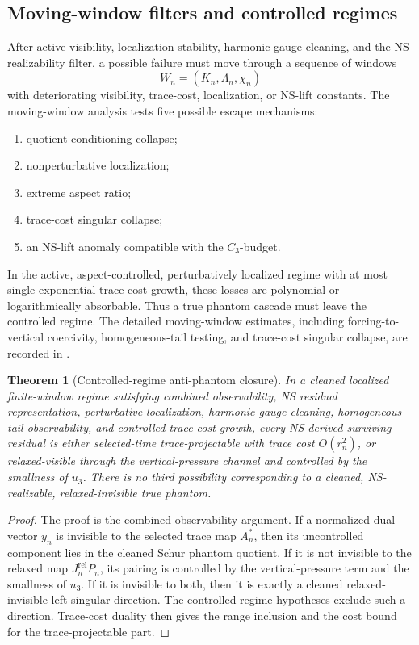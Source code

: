 \documentclass[11pt]{article}
\numberwithin{equation}{section}
\newtheorem{theorem}{Theorem}[section]
\newcommand{\rel}{\mathrm{rel}}
\begin{document}
\subsection{Moving-window filters and controlled regimes}
After active visibility, localization stability, harmonic-gauge cleaning, and the NS-realizability filter, a possible failure must move through a sequence of windows
\[
  W_n=(K_n,\Lambda_n,\chi_n)
\]
with deteriorating visibility, trace-cost, localization, or NS-lift constants. The moving-window analysis tests five possible escape mechanisms:
\begin{enumerate}[label=(\roman*)]
\item quotient conditioning collapse;
\item nonperturbative localization;
\item extreme aspect ratio;
\item trace-cost singular collapse;
\item an NS-lift anomaly compatible with the \(C_3\)-budget.
\end{enumerate}
In the active, aspect-controlled, perturbatively localized regime with at most single-exponential trace-cost growth, these losses are polynomial or logarithmically absorbable. Thus a true phantom cascade must leave the controlled regime. The detailed moving-window estimates, including forcing-to-vertical coercivity, homogeneous-tail testing, and trace-cost singular collapse, are recorded in .

\begin{theorem}[Controlled-regime anti-phantom closure]
In a cleaned localized finite-window regime satisfying combined observability, NS residual representation, perturbative localization, harmonic-gauge cleaning, homogeneous-tail observability, and controlled trace-cost growth, every NS-derived surviving residual is either selected-time trace-projectable with trace cost \(O(r_n^2)\), or relaxed-visible through the vertical-pressure channel and controlled by the smallness of \(u_3\). There is no third possibility corresponding to a cleaned, NS-realizable, relaxed-invisible true phantom.
\end{theorem}

\begin{proof}
The proof is the combined observability argument. If a normalized dual vector \(y_n\) is invisible to the selected trace map \(A_n^*\), then its uncontrolled component lies in the cleaned Schur phantom quotient. If it is not invisible to the relaxed map \(J_n^{\rel}P_n\), its pairing is controlled by the vertical-pressure term and the smallness of \(u_3\). If it is invisible to both, then it is exactly a cleaned relaxed-invisible left-singular direction. The controlled-regime hypotheses exclude such a direction. Trace-cost duality then gives the range inclusion and the cost bound for the trace-projectable part.
\end{proof}
\end{document}
